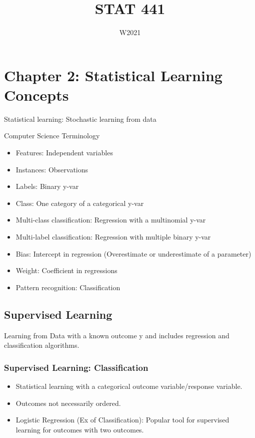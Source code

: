 \documentclass[12pt, oneside]{article}
\title{STAT 441}
\date{W2021}
\begin{document}
\maketitle

\newpage

\tableofcontents

\newpage

\section{Chapter 2: Statistical Learning Concepts}


Statistical learning: Stochastic learning from data

Computer Science Terminology
\begin{itemize}
   \item Features: Independent variables
   \item Instances: Observations
   \item Labels: Binary y-var
   \item Class: One category of a categorical y-var
   \item Multi-class classification: Regression with a multinomial y-var
   \item Multi-label classification: Regression with multiple binary y-var
   \item Bias: Intercept in regression (Overestimate or underestimate of a parameter)
   \item Weight: Coefficient in regressions
   \item Pattern recognition: Classification
\end{itemize}

\subsection{Supervised Learning}

Learning from Data with a known outcome y and includes regression and classification algorithms.

\subsubsection{Supervised Learning: Classification}
\begin{itemize}
    \item Statistical learning with a categorical outcome variable/response variable.
    \item Outcomes not necessarily ordered.
    \item Logistic Regression (Ex of Classification): Popular tool for supervised learning for outcomes with two outcomes.
\end{itemize}
\end{document}
